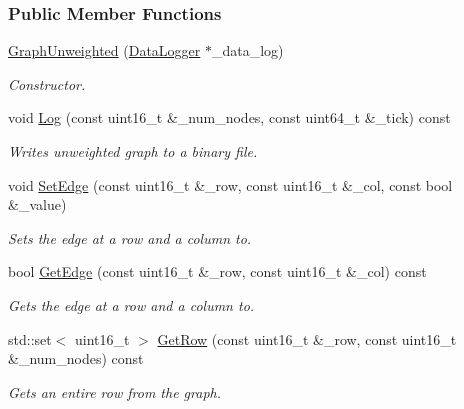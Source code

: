 \subsubsection*{Public Member Functions}
\begin{DoxyCompactItemize}
\item 
\hyperlink{classosse_1_1collaborate_1_1_graph_unweighted_a5b5c79a90fa8a8957f98e0dc4f5bafb6}{Graph\+Unweighted} (\hyperlink{classosse_1_1collaborate_1_1_data_logger}{Data\+Logger} $\ast$\+\_\+data\+\_\+log)
\begin{DoxyCompactList}\small\item\em Constructor. \end{DoxyCompactList}\item 
void \hyperlink{classosse_1_1collaborate_1_1_graph_unweighted_a06fa72fc5e51142a242fdf535af96078}{Log} (const uint16\+\_\+t \&\+\_\+num\+\_\+nodes, const uint64\+\_\+t \&\+\_\+tick) const
\begin{DoxyCompactList}\small\item\em Writes unweighted graph to a binary file. \end{DoxyCompactList}\item 
void \hyperlink{classosse_1_1collaborate_1_1_graph_unweighted_ae118a5f9c0bc24858192d13cac995f76}{Set\+Edge} (const uint16\+\_\+t \&\+\_\+row, const uint16\+\_\+t \&\+\_\+col, const bool \&\+\_\+value)
\begin{DoxyCompactList}\small\item\em Sets the edge at a row and a column to. \end{DoxyCompactList}\item 
bool \hyperlink{classosse_1_1collaborate_1_1_graph_unweighted_a60c3d775df67e19dbc49134b629c750d}{Get\+Edge} (const uint16\+\_\+t \&\+\_\+row, const uint16\+\_\+t \&\+\_\+col) const
\begin{DoxyCompactList}\small\item\em Gets the edge at a row and a column to. \end{DoxyCompactList}\item 
std\+::set$<$ uint16\+\_\+t $>$ \hyperlink{classosse_1_1collaborate_1_1_graph_unweighted_a7f648d33e2f67f09cd45395c4f8f736f}{Get\+Row} (const uint16\+\_\+t \&\+\_\+row, const uint16\+\_\+t \&\+\_\+num\+\_\+nodes) const
\begin{DoxyCompactList}\small\item\em Gets an entire row from the graph. \end{DoxyCompactList}\item 

\end{DoxyCompactItemize}
